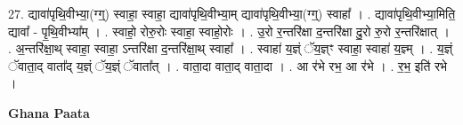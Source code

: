 \documentclass[17pt]{extarticle}
\begin{document}
27. द्यावा॑पृथि॒वीभ्या॒(ग्ग्॒) स्वाहा॒ स्वाहा॒ द्यावा॑पृथि॒वीभ्या॒म् द्यावा॑पृथि॒वीभ्या॒(ग्ग्॒) स्वाहा᳚ । . द्यावा॑पृथि॒वीभ्या॒मिति॒ द्यावा᳚ - पृ॒थि॒वीभ्या᳚म् । . स्वाहो॒ रोरु॒रोः स्वाहा॒ स्वाहो॒रोः । . उ॒रो र॒न्तरि॑क्षा द॒न्तरि॑क्षा दु॒रो रु॒रो र॒न्तरि॑क्षात् । . अ॒न्तरि॑क्षा॒थ् स्वाहा॒ स्वाहा॒ ऽन्तरि॑क्षा द॒न्तरि॑क्षा॒थ् स्वाहा᳚ । . स्वाहा॑ य॒ज्ञ्ं ॅय॒ज्ञ्ꣳ स्वाहा॒ स्वाहा॑ य॒ज्ञ्म् । . य॒ज्ञ्ं ॅवाता॒द् वाता᳚द् य॒ज्ञ्ं ॅय॒ज्ञ्ं ॅवाता᳚त् । . वाता॒दा वाता॒द् वाता॒दा । . आ र॑भे रभ॒ आ र॑भे । . र॒भ॒ इति॑ रभे । \newline

\textbf{Ghana Paata } \newline
\end{document}

